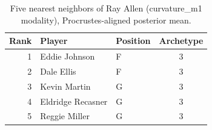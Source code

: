 \begin{table}[htbp]
  \centering\small
  \begin{tabular}{rllc}
    \toprule
    Rank & Player & Position & Archetype \\
    \midrule
    1 & Eddie Johnson & F & 3 \\
    2 & Dale Ellis & F & 3 \\
    3 & Kevin Martin & G & 3 \\
    4 & Eldridge Recasner & G & 3 \\
    5 & Reggie Miller & G & 3 \\
    \bottomrule
  \end{tabular}
  \caption{Five nearest neighbors of Ray Allen (curvature_m1 modality), Procrustes-aligned posterior mean.}
  \label{tab:Ray_Allen_neighbors_curvature_m1}
\end{table}

